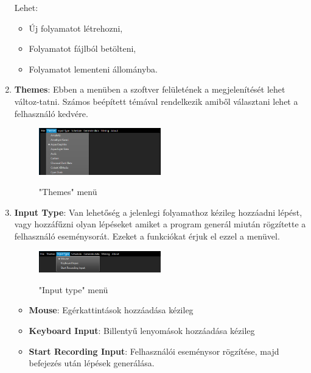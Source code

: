 \begin{enumerate}
{		Lehet: 
		\begin{itemize}
			\item{Új folyamatot létrehozni,}
			\item{Folyamatot fájlból betölteni,}
			\item{Folyamatot lementeni állományba.}
		\end{itemize}
	}
	\item{
		\textbf{Themes}: Ebben a menüben a szoftver felületének a megjelenítését lehet változ\hyp{}tatni. Számos beépített témával rendelkezik amiből választani lehet a felhasználó kedvére.
		\begin{figure}[h]
			\begin{center}
				\caption{"Themes" menü}
				\includegraphics[width=0.5\textwidth, keepaspectratio=true]{images/img_ui_themes}\\
				\label{fig:example}
			\end{center}
		\end{figure}
	}
	\item{
		\textbf{Input Type}: Van lehetőség a jelenlegi folyamathoz kézileg hozzáadni lépést, vagy hozzáfűzni olyan lépéseket amiket a program generál miután rögzítette a felhasználó eseménysorát. Ezeket a funkciókat érjuk el ezzel a menüvel.
		\begin{figure}[h]
			\begin{center}
				\caption{"Input type" menü}
				\includegraphics[width=0.5\textwidth, keepaspectratio=true]{images/img_ui_input}\\
				\label{fig:example}
			\end{center}
		\end{figure}
		\begin{itemize}
			\item{\textbf{Mouse}: Egérkattintások hozzáadása kézileg}
			\item{\textbf{Keyboard Input}: Billentyű lenyomások hozzáadása kézileg}
			\item{\textbf{Start Recording Input}: Felhasználói eseménysor rögzítése, majd befejezés után lépések generálása.}

\end{itemize}}
\end{enumerate}
